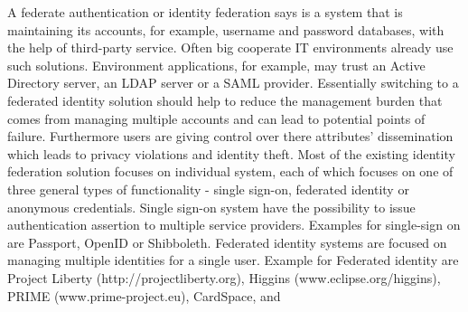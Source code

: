 A federate authentication or identity federation says \cite{Boyed:2012:GSOA} is a system that is maintaining its accounts, for example, username and password databases, with the help of third-party service. Often big cooperate IT environments already use such solutions. Environment applications, for example, may trust an Active Directory server, an LDAP server or a SAML provider. Essentially switching to a federated identity solution should help to reduce the management burden that comes from managing multiple accounts and can lead to potential points of failure.  Furthermore users are giving control over there attributes' dissemination which leads to privacy violations and identity theft. Most of the existing identity federation solution focuses on individual system, each of which focuses on one of three general types of functionality - single sign-on, federated identity or anonymous credentials. Single sign-on system have the possibility to issue authentication assertion to multiple service providers. Examples for single-sign on are Passport, OpenID or Shibboleth. Federated identity systems are focused on managing multiple identities for a single user. Example for Federated identity are Project Liberty (http://projectliberty.org), Higgins (www.eclipse.org/higgins), PRIME (www.prime-project.eu), CardSpace, and
